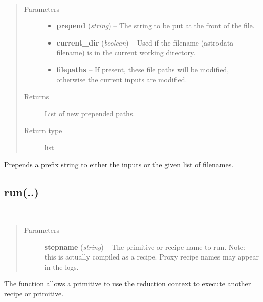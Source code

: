 \documentclass[letterpaper,10pt,english]{sphinxmanual}
\begin{document}
\begin{fulllineitems}
\label{chapter_ReductionContextClass:astrodata.RecipeManager.ReductionContext.prepend_names}~\begin{quote}\begin{description}
\item[{Parameters}] \leavevmode\begin{itemize}
\item {} 
\textbf{prepend} (\emph{string}) -- The string to be put at the front of the file.

\item {} 
\textbf{current\_dir} (\emph{boolean}) -- Used if the filename (astrodata filename) is in the
current working directory.

\item {} 
\textbf{filepaths} -- If present, these file paths will be modified, otherwise
the current inputs are modified.

\end{itemize}

\item[{Returns}] \leavevmode
List of new prepended paths.

\item[{Return type}] \leavevmode
list

\end{description}\end{quote}

Prepends a prefix string to either the inputs or the given list of filenames.

\end{fulllineitems}



\subsection{run(..)}
\label{chapter_ReductionContextClass:run}

\begin{fulllineitems}
\label{chapter_ReductionContextClass:astrodata.RecipeManager.ReductionContext.run}~\begin{quote}\begin{description}
\item[{Parameters}] \leavevmode
\textbf{stepname} (\emph{string}) -- The primitive or recipe name to run. Note: this is 
actually compiled as a recipe. Proxy recipe names may appear
in the logs.

\end{description}\end{quote}

The  function allows a primitive to use the reduction
context to execute another recipe or primitive.

\end{fulllineitems}
\end{document}
